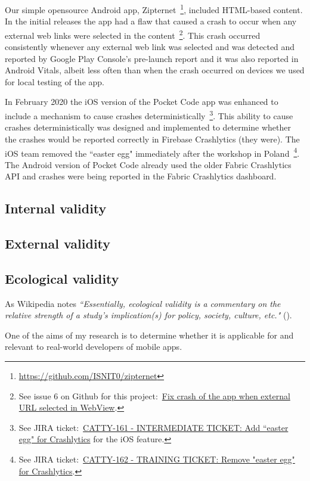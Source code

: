 Our simple opensource Android app, Zipternet~\footnote{\url{https://github.com/ISNIT0/zipternet}}, included HTML-based content. In the initial releases the app had a flaw that caused a crash to occur when any external web links were selected in the content~\footnote{See issue 6 on Github for this project:~\href{https://github.com/ISNIT0/zipternet/issues/6}{Fix crash of the app when external URL selected in WebView}.}. This crash occurred consistently whenever any external web link was selected and was detected and reported by Google Play Console's pre-launch report and it was also reported in Android Vitals, albeit less often than when the crash occurred on devices we used for local testing of the app.


In February 2020 the iOS version of the Pocket Code app was enhanced to include a mechanism to cause crashes deterministically~\footnote{See JIRA ticket:~\href{https://jira.catrob.at/browse/CATTY-161}{CATTY-161 - INTERMEDIATE TICKET: Add ``easter egg" for Crashlytics} for the iOS feature.}. This ability to cause crashes deterministically was designed and implemented to determine whether the crashes would be reported correctly in Firebase Crashlytics (they were). The iOS team removed the ``easter egg" immediately after the workshop in Poland~\footnote{See JIRA ticket:~\href{https://jira.catrob.at/browse/CATTY-162}{CATTY-162 - TRAINING TICKET: Remove "easter egg" for Crashlytics}.}. The Android version of Pocket Code already used the older Fabric Crashlytics API and crashes were being reported in the Fabric Crashlytics dashboard.

\subsection{Internal validity}

\subsection{External validity}

\subsection{Ecological validity}
As Wikipedia notes \emph{``Essentially, ecological validity is a commentary on the relative strength of a study's implication(s) for policy, society, culture, etc."} (\cite{wikipedia_ecological_validity}).

One of the aims of my research is to determine whether it is applicable for and relevant to real-world developers of mobile apps. 

